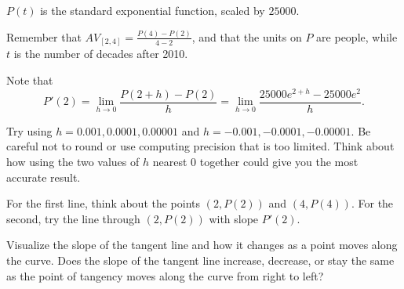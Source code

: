 \begin{bighint}
\ba
	\item $P(t)$ is the standard exponential function, scaled by $25000$.
	\item Remember that $AV_{[2,4]} = \frac{P(4)-P(2)}{4-2}$, and that the units on $P$ are people, while $t$ is the number of decades after 2010. 
	\item Note that
	$$P'(2) = \lim_{h \to 0} \frac{P(2+h)-P(2)}{h} = \lim_{h \to 0} \frac{25000 e^{2+h}-25000e^2}{h}.$$  
	\item Try using $h = 0.001, 0.0001, 0.00001$ and $h = -0.001, -0.0001, -0.00001$.  Be careful not to round or use computing precision that is too limited.  Think about how using the two values of $h$ nearest 0 together could give you the most accurate result.
	\item For the first line, think about the points $(2,P(2))$ and $(4,P(4))$.  For the second, try the line through $(2,P(2))$ with slope $P'(2)$.
	\item Visualize the slope of the tangent line and how it changes as a point moves along the curve.  Does the slope of the tangent line increase, decrease, or stay the same as the point of tangency moves along the curve from right to left?
\ea
\end{bighint}
